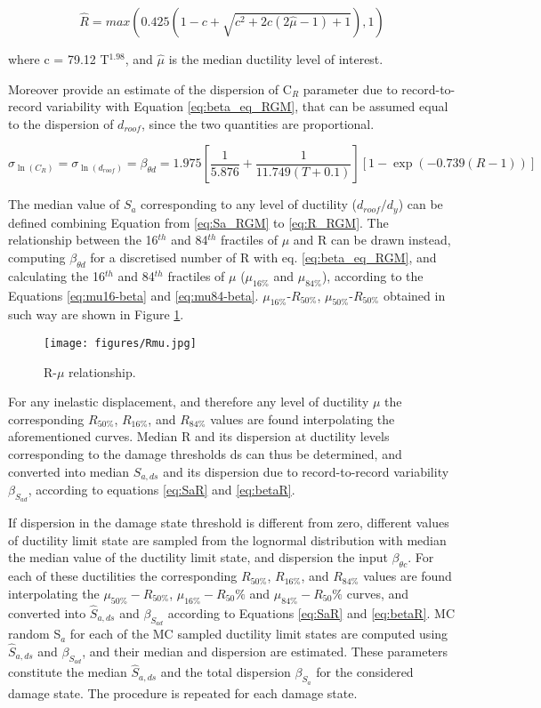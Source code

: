 \begin{equation}
\hat{R} = max(0.425(1 - c + \sqrt{c^2 + 2c(2 \hat{\mu} - 1) + 1}),1)
\label{eq:R_RGM}
\end{equation}

where c = 79.12 T$^{1.98}$, and $\hat{\mu}$ is the median ductility level of interest.

Moreover \citep{RuizGarciaMiranda2007} provide an estimate of the dispersion of C$_{R}$ parameter due to record-to-record variability with Equation \ref{eq:beta_eq_RGM}, that can be assumed equal to the dispersion of $d_{roof}$, since the two quantities are proportional.

\begin{equation}
\sigma_{\ln(C_R)} = \sigma_{\ln(d_{roof})} = \beta_{\theta d} = 1.975 [\frac{1}{5.876} + \frac{1}{11.749 (T + 0.1)}] [1- \exp(-0.739 (R - 1))]
\label{eq:beta_eq_RGM}
\end{equation}

The median value of $S_a$ corresponding to any level of ductility ($d_{roof}/d_y$) can be defined combining Equation from \ref{eq:Sa_RGM} to \ref{eq:R_RGM}. The relationship between the 16$^{th}$ and 84$^{th}$ fractiles of $\mu$ and R can be drawn instead, computing $\beta_{\theta d}$ for a discretised number of R with eq. \ref{eq:beta_eq_RGM}, and calculating the 16$^{th}$ and 84$^{th}$ fractiles of $\mu$ ($\mu_{16\%}$ and $\mu_{84\%}$), according to the Equations \ref{eq:mu16-beta} and \ref{eq:mu84-beta}. $\mu_{16\%}$-$R_{50\%}$, $\mu_{50\%}$-$R_{50\%}$ obtained in such way are shown in Figure \ref{fig:Rmu}.

\begin{figure}[!htbp]
\centering
\texttt{[image: figures/Rmu.jpg]}
\caption{R-$\mu$ relationship.}
\label{fig:Rmu}
\end{figure}

For any inelastic displacement, and therefore any level of ductility $\mu$ the corresponding $R_{50\%}$, $R_{16\%}$, and $R_{84\%}$ values are found interpolating the aforementioned curves. Median R and its dispersion at ductility levels corresponding to the damage thresholds ds can thus be determined, and converted into median $S_{a, ds}$ and its dispersion due to record-to-record variability $\beta_{S_{a d}}$, according to equations \ref{eq:SaR} and \ref{eq:betaR}. 

If dispersion in the damage state threshold is different from zero, different values of ductility limit state are sampled from the lognormal distribution with median the median value of the ductility limit state, and dispersion the input $\beta_{\theta c}$. For each of these ductilities the corresponding $R_{50\%}$, $R_{16\%}$, and $R_{84\%}$ values are found interpolating the $\mu_{50\%}-R_{50\%}$, $\mu_{16\%}-R_50\%$ and $\mu_{84\%}-R_50\%$ curves, and converted into $\hat{S}_{a,ds}$ and $\beta_{S_{a d}}$ according to Equations \ref{eq:SaR} and \ref{eq:betaR}. MC random S$_a$ for each of the MC sampled ductility limit states are computed using $\hat{S}_{a,ds}$ and $\beta_{S_{a d}}$, and their median and dispersion are estimated. These parameters constitute the median $\hat{S}_{a,ds}$ and the total dispersion $\beta_{S_a}$ for the considered damage state. The procedure is repeated for each damage state.

